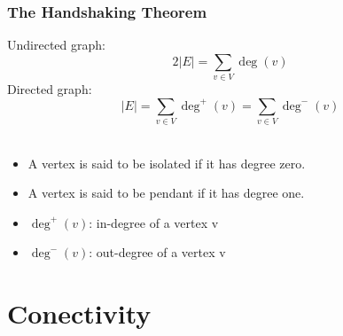 \documentclass{beamer}
\begin{document}
\begin{frame}
    \frametitle{The Handshaking Theorem}
    Undirected graph:
    $$2|E| = \sum_{v\in V}\deg(v)$$
    Directed graph:
    $$|E| = \sum_{v\in V} \deg^+ (v) = \sum_{v\in V} \deg^- (v)$$
    \\
    \begin{itemize}
        \item A vertex is said to be isolated if it has degree zero.
        \item A vertex is said to be pendant if it has degree one.
        \item $\deg^+(v)$: in-degree of a vertex v
        \item $\deg^-(v)$: out-degree of a vertex v
    \end{itemize}
\end{frame}
\section{Conectivity}
\end{document}
